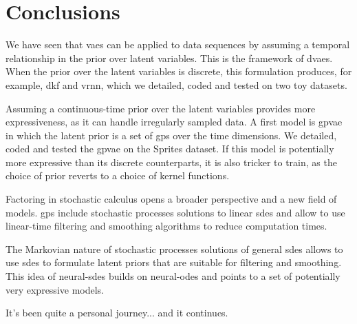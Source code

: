 \chapter{Conclusions}\label{sec:Conclusion}

We have seen that \glspl{vae} can be applied to data sequences by assuming a temporal relationship in the prior over latent variables. 
This is the framework of \glspl{dvae}. When the prior over the latent variables is discrete, this formulation produces, for example, 
\gls{dkf} and \gls{vrnn}, which we detailed, coded and tested on two toy datasets.

Assuming a continuous-time prior over the latent variables provides more expressiveness, as it can handle irregularly sampled data. 
A first model is \gls{gpvae} in which the latent prior is a set of \glspl{gp} over the time dimensions. We detailed, coded and tested 
the \gls{gpvae} on the Sprites dataset. If this model is potentially more expressive than its discrete counterparts, it is also 
tricker to train, as the choice of prior reverts to a choice of kernel functions.

Factoring in stochastic calculus opens a broader perspective and a new field of models. \glspl{gp} include stochastic processes 
solutions to linear \glspl{sde} and allow to use linear-time filtering and smoothing algorithms to reduce computation times. 

The Markovian nature of stochastic processes solutions of general \glspl{sde} allows to use \glspl{sde} to formulate latent priors 
that are suitable for filtering and smoothing. This idea of \glspl{neural-sde} builds on \glspl{neural-ode} and points to a 
set of potentially very expressive models.

It's been quite a personal journey... and it continues.